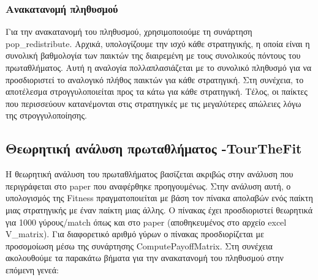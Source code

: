 \documentclass[a4paper,12pt]{article}
\begin{document}
\subsubsection*{Ανακατανομή πληθυσμού}
Για την ανακατανομή του πληθυσμού, χρησιμοποιούμε τη συνάρτηση \foreignlanguage{english}{pop\_redistribute}. Αρχικά, υπολογίζουμε την ισχύ κάθε στρατηγικής, η οποία είναι η συνολική βαθμολογία των παικτών της διαιρεμένη με τους συνολικούς πόντους του πρωταθλήματος. Αυτή η αναλογία πολλαπλασιάζεται με το συνολικό πληθυσμό για να προσδιοριστεί το αναλογικό πλήθος παικτών για κάθε στρατηγική. Στη συνέχεια, το αποτέλεσμα στρογγυλοποιείται προς τα κάτω για κάθε στρατηγική. Τέλος, οι παίκτες που περισσεύουν κατανέμονται στις στρατηγικές με τις μεγαλύτερες απώλειες λόγω της στρογγυλοποίησης.



\subsection{Θεωρητική ανάλυση πρωταθλήματος \foreignlanguage{english}{-TourTheFit}}
Η θεωρητική ανάλυση του πρωταθλήματος βασίζεται ακριβώς στην ανάλυση που περιγράφεται στο \foreignlanguage{english}{paper} που αναφέρθηκε προηγουμένως. Στην ανάλυση αυτή, ο υπολογισμός της \foreignlanguage{english}{Fitness} πραγματοποιείται με βάση τον πίνακα απολαβών ενός παίκτη μιας στρατηγικής με έναν παίκτη μιας άλλης. Ο πίνακας έχει προσδιοριστεί θεωρητικά για 1000 γύρους/\foreignlanguage{english}{match} όπως και στο \foreignlanguage{english}{paper} (αποθηκευμένος στο αρχείο \foreignlanguage{english}{excel V\_{matrix})}. Για διαφορετικό αριθμό γύρων ο πίνακας προσδιορίζεται με προσομοίωση μέσω της συνάρτησης \foreignlanguage{english}{ComputePayoffMatrix}. Στη συνέχεια ακολουθούμε τα παρακάτω βήματα για την ανακατανομή του πληθυσμού στην επόμενη γενεά:
\end{document}
